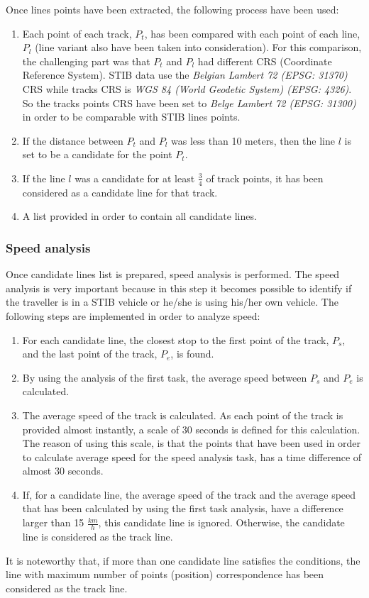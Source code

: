 \documentclass{article}
\begin{document}
\newline
Once lines points have been extracted, the following process have been used:
\begin{enumerate}
    \item Each point of each track, $P_t$, has been compared with each point of each line, $P_l$ (line variant also have been taken into consideration). For this comparison, the challenging part was that $P_t$ and $P_l$ had different CRS (Coordinate Reference System). STIB data use the \textit{Belgian Lambert 72 (EPSG: 31370)} CRS while tracks CRS is \textit{WGS 84 (World Geodetic System) (EPSG: 4326)}. So the tracks points CRS have been set to \textit{Belge Lambert 72 (EPSG: 31300)} in order to be comparable with STIB lines points.
    \item If the distance between $P_t$ and $P_l$ was less than 10 meters, then the line $l$ is set to be a candidate for the point $P_t$.
    \item If the line $l$ was a candidate for at least $\frac{3}{4}$ of track points, it has been considered as a candidate line for that track.
    \item A list provided in order to contain all candidate lines.
\end{enumerate}
\subsubsection{Speed analysis}

Once candidate lines list is prepared, speed analysis is performed. The speed analysis is very important because in this step it becomes possible to identify if the traveller is in a STIB vehicle or he/she is using his/her own vehicle.
The following steps are implemented in order to analyze speed:
\begin{enumerate}
    \item For each candidate line, the closest stop to the first point of the track, $P_s$, and the last point of the track, $P_e$, is found.
    \item By using the analysis of the first task, the average speed between $P_s$ and $P_e$ is calculated.
    \item The average speed of the track is calculated. As each point of the track is provided almost instantly, a scale of 30 seconds is defined for this calculation. The reason of using this scale, is that the points that have been used in order to calculate average speed for the speed analysis task, has a time difference of almost 30 seconds.
    \item If, for a candidate line, the average speed of the track and the average speed that has been calculated by using the first task analysis, have a difference larger than 15 $\frac{km}{h}$, this candidate line is ignored. Otherwise, the candidate line is considered as the track line.
\end{enumerate}
It is noteworthy that, if more than one candidate line satisfies the conditions, the line with maximum number of points (position) correspondence has been considered as the track line.
\end{document}

